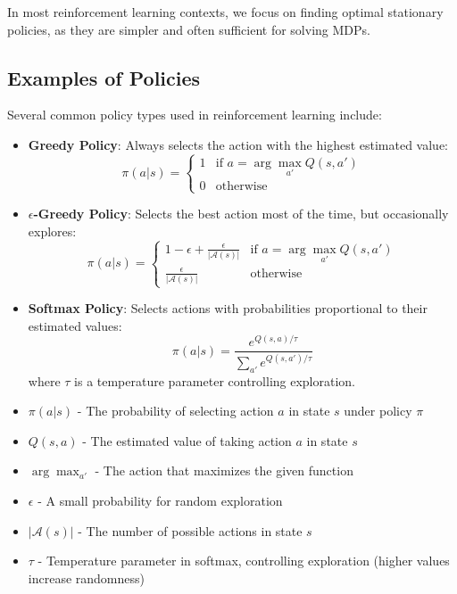 \documentclass[12pt,a4paper]{article}
\begin{document}
In most reinforcement learning contexts, we focus on finding optimal stationary policies, as they are simpler and often sufficient for solving MDPs.

\subsection{Examples of Policies}

Several common policy types used in reinforcement learning include:

\begin{itemize}
    \item \textbf{Greedy Policy}: Always selects the action with the highest estimated value:
    \begin{equation}
    \pi(a|s) = 
    \begin{cases}
    1 & \text{if } a = \arg\max_{a'} Q(s,a') \\
    0 & \text{otherwise}
    \end{cases}
    \end{equation}
    
    \item \textbf{$\epsilon$-Greedy Policy}: Selects the best action most of the time, but occasionally explores:
    \begin{equation}
    \pi(a|s) = 
    \begin{cases}
    1 - \epsilon + \frac{\epsilon}{|\mathcal{A}(s)|} & \text{if } a = \arg\max_{a'} Q(s,a') \\
    \frac{\epsilon}{|\mathcal{A}(s)|} & \text{otherwise}
    \end{cases}
    \end{equation}
    
    \item \textbf{Softmax Policy}: Selects actions with probabilities proportional to their estimated values:
    \begin{equation}
    \pi(a|s) = \frac{e^{Q(s,a)/\tau}}{\sum_{a'} e^{Q(s,a')/\tau}}
    \end{equation}
    where $\tau$ is a temperature parameter controlling exploration.
\end{itemize}

\begin{tcolorbox}[title=Notation Overview]
\begin{itemize}
    \item $\pi(a|s)$ - The probability of selecting action $a$ in state $s$ under policy $\pi$
    \item $Q(s,a)$ - The estimated value of taking action $a$ in state $s$
    \item $\arg\max_{a'}$ - The action that maximizes the given function
    \item $\epsilon$ - A small probability for random exploration
    \item $|\mathcal{A}(s)|$ - The number of possible actions in state $s$
    \item $\tau$ - Temperature parameter in softmax, controlling exploration (higher values increase randomness)
\end{itemize}
\end{tcolorbox}
\end{document}
